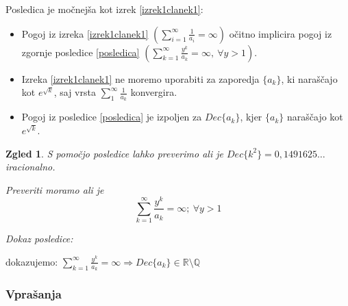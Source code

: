 \documentclass{beamer}
\def\Q{\mathbb{Q}} %
\def\R{\mathbb{R}} %
\newtheorem{zgled}{Zgled}
\begin{document}
\begin{frame}
    Posledica je močnejša kot izrek \ref{izrek1clanek1}:
    \begin{itemize}
        \item Pogoj iz izreka \ref{izrek1clanek1} 
        $(\sum_{i=1}^{\infty} \frac{1}{a_i} = \infty)$ očitno implicira
        pogoj iz zgornje posledice \ref{posledica}
        $(\sum_{k=1}^{\infty}\frac{y^k}{a_k} = \infty , \ \forall y > 1)$.
        \pause
        \item Izreka \ref{izrek1clanek1} ne moremo uporabiti za zaporedja $\{a_k\}$, ki naraščajo kot $e^{\sqrt{k}}$,
                saj vrsta $\sum_1^{\infty}\frac{1}{a_k}$ konvergira.
            \pause
        \item Pogoj iz posledice \ref{posledica} je izpoljen za $Dec\{a_k\}$, kjer $\{a_k\}$ naraščajo kot $e^{\sqrt{k}}$.

    \end{itemize}
\end{frame}

\begin{frame}
    \begin{zgled}
        S pomočjo posledice lahko preverimo ali je $Dec\{k^2\} = 0,1491625\dots$ iracionalno.
        \pause
        
        Preveriti moramo ali je \[\sum_{k=1}^{\infty}\frac{y^k}{a_k} = \infty; \ \forall y > 1\]
    \end{zgled}


\end{frame}

\begin{frame}
    \emph{Dokaz posledice:}

    dokazujemo: $\sum_{k=1}^{\infty}\frac{y^k}{a_k} = \infty \Rightarrow Dec\{a_k\} \in \R \setminus \Q$
    \newline
    \newline
    \newline
    \newline
    \newline
    \newline
    \newline
    \newline
    \newline
    \newline
    \newline
    \newline
    \newline
\end{frame}

\begin{frame}
    \frametitle{Vprašanja}
\end{frame}
\end{document}
